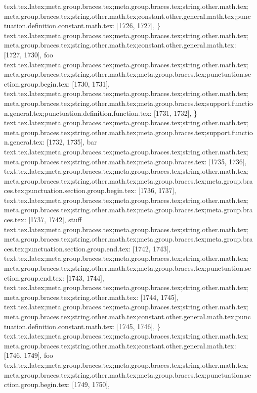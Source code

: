 {{{{{{{{{{{{{{{{{{{{{{{{{{{{{{{{{{{{{{{{{{{{}
text.tex.latex;meta.group.braces.tex;meta.group.braces.tex;string.other.math.tex;meta.group.braces.tex;string.other.math.tex;constant.other.general.math.tex;punctuation.definition.constant.math.tex: [1726, 1727], {\}
text.tex.latex;meta.group.braces.tex;meta.group.braces.tex;string.other.math.tex;meta.group.braces.tex;string.other.math.tex;constant.other.general.math.tex: [1727, 1730], {foo}
text.tex.latex;meta.group.braces.tex;meta.group.braces.tex;string.other.math.tex;meta.group.braces.tex;string.other.math.tex;meta.group.braces.tex;punctuation.section.group.begin.tex: [1730, 1731], {{}
text.tex.latex;meta.group.braces.tex;meta.group.braces.tex;string.other.math.tex;meta.group.braces.tex;string.other.math.tex;meta.group.braces.tex;support.function.general.tex;punctuation.definition.function.tex: [1731, 1732], {\}
text.tex.latex;meta.group.braces.tex;meta.group.braces.tex;string.other.math.tex;meta.group.braces.tex;string.other.math.tex;meta.group.braces.tex;support.function.general.tex: [1732, 1735], {bar}
text.tex.latex;meta.group.braces.tex;meta.group.braces.tex;string.other.math.tex;meta.group.braces.tex;string.other.math.tex;meta.group.braces.tex: [1735, 1736], { }
text.tex.latex;meta.group.braces.tex;meta.group.braces.tex;string.other.math.tex;meta.group.braces.tex;string.other.math.tex;meta.group.braces.tex;meta.group.braces.tex;punctuation.section.group.begin.tex: [1736, 1737], {{}
text.tex.latex;meta.group.braces.tex;meta.group.braces.tex;string.other.math.tex;meta.group.braces.tex;string.other.math.tex;meta.group.braces.tex;meta.group.braces.tex: [1737, 1742], {stuff}
text.tex.latex;meta.group.braces.tex;meta.group.braces.tex;string.other.math.tex;meta.group.braces.tex;string.other.math.tex;meta.group.braces.tex;meta.group.braces.tex;punctuation.section.group.end.tex: [1742, 1743], {}}
text.tex.latex;meta.group.braces.tex;meta.group.braces.tex;string.other.math.tex;meta.group.braces.tex;string.other.math.tex;meta.group.braces.tex;punctuation.section.group.end.tex: [1743, 1744], {}}
text.tex.latex;meta.group.braces.tex;meta.group.braces.tex;string.other.math.tex;meta.group.braces.tex;string.other.math.tex: [1744, 1745], {
}
text.tex.latex;meta.group.braces.tex;meta.group.braces.tex;string.other.math.tex;meta.group.braces.tex;string.other.math.tex;constant.other.general.math.tex;punctuation.definition.constant.math.tex: [1745, 1746], {\}
text.tex.latex;meta.group.braces.tex;meta.group.braces.tex;string.other.math.tex;meta.group.braces.tex;string.other.math.tex;constant.other.general.math.tex: [1746, 1749], {foo}
text.tex.latex;meta.group.braces.tex;meta.group.braces.tex;string.other.math.tex;meta.group.braces.tex;string.other.math.tex;meta.group.braces.tex;punctuation.section.group.begin.tex: [1749, 1750], {{}
}}}}}}}}}}}}}}}}}}}}}}}}}}}}}}}}}}}}}}}}}}}}}}}
